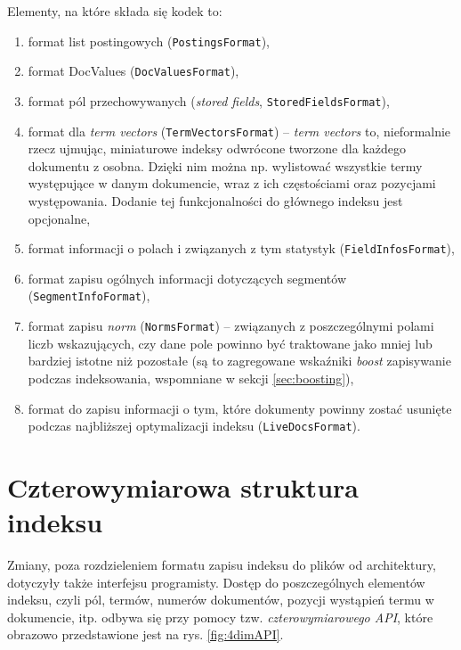 Elementy, na które składa się kodek to:
\begin{enumerate}
 \item format list postingowych (\texttt{PostingsFormat}),
 \item format DocValues (\texttt{DocValuesFormat}),
 \item format pól przechowywanych (\emph{stored fields}, \texttt{StoredFieldsFormat}),
 \item format dla \emph{term vectors} (\texttt{TermVectorsFormat}) -- \emph{term vectors} to, nieformalnie rzecz ujmując, miniaturowe indeksy odwrócone tworzone dla każdego dokumentu z osobna. Dzięki nim można np. wylistować wszystkie termy występujące w danym dokumencie, wraz z ich częstościami oraz pozycjami występowania. Dodanie tej funkcjonalności do głównego indeksu jest opcjonalne,
 \item format informacji o polach i związanych z tym statystyk (\texttt{FieldInfosFormat}),
 \item format zapisu ogólnych informacji dotyczących segmentów (\texttt{SegmentInfoFormat}),
 \item format zapisu \emph{norm} (\texttt{NormsFormat}) -- związanych z poszczególnymi polami liczb wskazujących, czy dane pole powinno być traktowane jako mniej lub bardziej istotne niż pozostałe (są to zagregowane wskaźniki \emph{boost} zapisywanie podczas indeksowania, wspomniane w sekcji \ref{sec:boosting}),
 \item format do zapisu informacji o tym, które dokumenty powinny zostać usunięte podczas najbliższej optymalizacji indeksu (\texttt{LiveDocsFormat}).
\end{enumerate}

\section{Czterowymiarowa struktura indeksu}
\label{sec:4dimAPI}

Zmiany, poza rozdzieleniem formatu zapisu indeksu do plików od architektury, dotyczyły także interfejsu programisty. Dostęp do poszczególnych elementów indeksu, czyli pól, termów, numerów dokumentów, pozycji wystąpień termu w dokumencie, itp. odbywa się przy pomocy tzw. \emph{czterowymiarowego API}, które obrazowo przedstawione jest na rys. \ref{fig:4dimAPI}.

